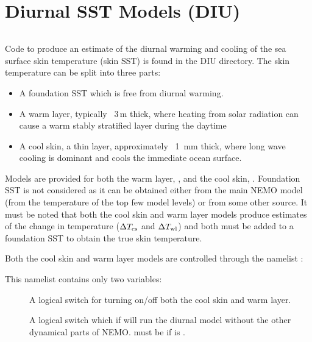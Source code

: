 \documentclass[../main/NEMO_manual]{subfiles}
\begin{document}
\chapter{Diurnal SST Models (DIU)}
\label{chap:DIU}

\minitoc


\newpage
$\ $\newline %

Code to produce an estimate of the diurnal warming and cooling of the sea surface skin
temperature (skin SST) is found in the DIU directory.  
The skin temperature can be split into three parts:
\begin{itemize}
\item
  A foundation SST which is free from diurnal warming.
\item
  A warm layer, typically ~3\,m thick,
  where heating from solar radiation can cause a warm stably stratified layer during the daytime
\item
  A cool skin, a thin layer, approximately ~1\, mm thick,
  where long wave cooling is dominant and cools the immediate ocean surface.
\end{itemize}

Models are provided for both the warm layer, , and the cool skin, .
Foundation SST is not considered as it can be obtained either from the main NEMO model
(\ie from the temperature of the top few model levels) or from some other source.  
It must be noted that both the cool skin and warm layer models produce estimates of the change in temperature
($\Delta T_{\rm{cs}}$ and $\Delta T_{\rm{wl}}$) and
both must be added to a foundation SST to obtain the true skin temperature.

Both the cool skin and warm layer models are controlled through the namelist :

This namelist contains only two variables:
\begin{description}
\item[]
  A logical switch for turning on/off both the cool skin and warm layer.
\item[]
  A logical switch which if  will run the diurnal model without the other dynamical parts of NEMO.
   must be  if  is .
\end{description}
\end{document}
